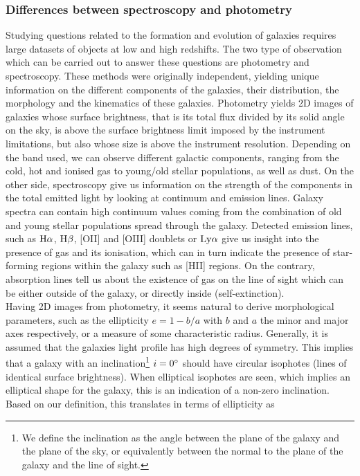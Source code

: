 \subsubsection{Differences between spectroscopy and photometry}
\label{subsubsec:photo_data}

Studying questions related to the formation and evolution of galaxies requires large datasets of objects at low and high redshifts. The two type of observation which can be carried out to answer these questions are photometry and spectroscopy. These methods were originally independent, yielding unique information on the different components of the galaxies, their distribution, the morphology and the kinematics of these galaxies.
Photometry yields 2D images of galaxies whose surface brightness, that is its total flux divided by its solid angle on the sky, is above the surface brightness limit imposed by the instrument limitations, but also whose size is above the instrument resolution. Depending on the band used, we can observe different galactic components, ranging from the cold, hot and ionised gas to young/old stellar populations, as well as dust.
On the other side, spectroscopy give us information on the strength of the components in the total emitted light by looking at continuum and emission lines. Galaxy spectra can contain high continuum values coming from the combination of old and young stellar populations spread through the galaxy. Detected emission lines, such as $\rm{H}{\alpha}$, $\rm{H}{\beta}$, [OII] and [OIII] doublets or $\rm{Ly}\alpha$ give us insight into the presence of gas and its ionisation, which can in turn indicate the presence of star-forming regions within the galaxy such as [HII] regions. On the contrary, absorption lines tell us about the existence of gas on the line of sight which can be either outside of the galaxy, or directly inside (self-extinction). \\
      
Having 2D images from photometry, it seems natural to derive morphological parameters, such as the ellipticity $e = 1 - b/a$ with $b$ and $a$ the minor and major axes respectively, or a measure of some characteristic radius. Generally, it is assumed that the galaxies light profile has high degrees of symmetry. This implies that a galaxy with an inclination\footnote{We define the inclination as the angle between the plane of the galaxy and the plane of the sky, or equivalently between the normal to the plane of the galaxy and the line of sight.} $i = 0 \degree$ should have circular isophotes (lines of identical surface brightness). When elliptical isophotes are seen, which implies an elliptical shape for the galaxy, this is an indication of a non-zero inclination. Based on our definition, this translates in terms of ellipticity as

